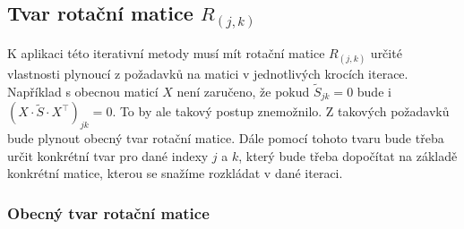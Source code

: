 \subsection{Tvar rotační matice \texorpdfstring{$R_{(j,k)}$}{Rjk}}%
\label{sub:tvar_rotacni_matice_Rjk}

K aplikaci této iterativní metody musí mít rotační matice $R_{(j,k)}$ určité vlastnosti plynoucí z požadavků na matici v jednotlivých krocích iterace. Například s obecnou maticí $X$ není zaručeno, že pokud $\tilde{S}_{jk} = 0$ bude i $\left(X \cdot \tilde{S} \cdot X^{\top} \right)_{jk} = 0$. To by ale takový postup znemožnilo. Z takových požadavků bude plynout obecný tvar rotační matice. Dále pomocí tohoto tvaru bude třeba určit konkrétní tvar pro dané indexy $j$ a $k$, který bude třeba dopočítat na základě konkrétní matice, kterou se snažíme rozkládat v dané iteraci.

\subsubsection{Obecný tvar rotační matice}%
\label{ssub:obecny_tvar_rotacni_matice}

